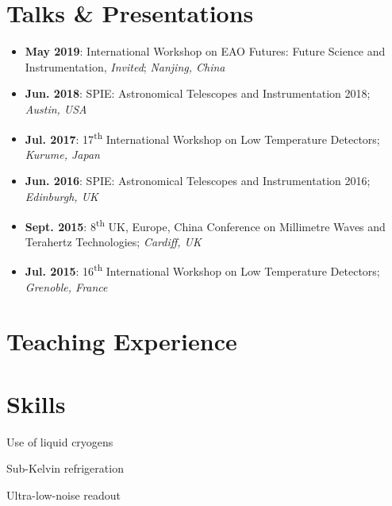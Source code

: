 \documentclass[11pt,a4paper]{moderncv}
\newcommand{\cvdoubleitemcustom}[3][.25em]{%
  \begin{minipage}[t]{\doubleitemcolumnwidth}#2\end{minipage}%
  \hfill %
\begin{minipage}[t]{\doubleitemcolumnwidth}#3\end{minipage}%
  \par\addvspace{#1}}
\begin{document}
\section{Talks \& Presentations}
\begin{itemize}
\item \textbf{May 2019}: International Workshop on EAO Futures: Future Science and Instrumentation, \textit{Invited}; \textit{Nanjing, China}
\item \textbf{Jun. 2018}: SPIE: Astronomical Telescopes and Instrumentation 2018; \textit{Austin, USA}
\item \textbf{Jul. 2017}: 17\textsuperscript{th} International Workshop on Low Temperature Detectors; \textit{Kurume, Japan}
\item \textbf{Jun. 2016}: SPIE: Astronomical Telescopes and Instrumentation 2016; \textit{Edinburgh, UK}
\item \textbf{Sept. 2015}: 8\textsuperscript{th} UK, Europe, China Conference on Millimetre Waves and Terahertz Technologies; \textit{Cardiff, UK}
\item \textbf{Jul. 2015}: 16\textsuperscript{th} International Workshop on Low Temperature Detectors; \textit{Grenoble, France}
\end{itemize}
%
\section{Teaching Experience}
%
\section{Skills}
\cvdoubleitemcustom{Use of liquid cryogens}{Sub-Kelvin refrigeration}
\cvdoubleitemcustom{Ultra-low-noise readout}{}
%
\end{document}
